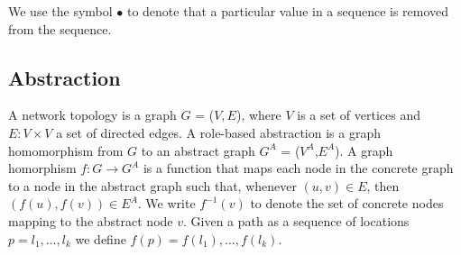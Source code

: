 \documentclass[twocolumn, openany]{sig-alternate-10pt}
\begin{document}



We use the symbol $\bullet$ to denote that a particular value in a sequence is removed from the sequence.

\subsection{Abstraction}

A network topology is a graph $G$ = ($V, E$), where $V$ is a set of vertices and $E \colon V \times V$ a set of directed edges. A role-based abstraction is a graph homomorphism from $G$ to an abstract graph $G^A$ = ($V^A$,$E^A$). A graph homorphism $f : G \rightarrow G^A$ is a function that maps each node in the concrete graph to a node in the abstract graph such that, whenever $(u,v) \in E$, then $(f(u),f(v)) \in E^A$. We write $f^{-1}(v)$ to denote the set of concrete nodes mapping to the abstract node $v$. Given a path as a sequence of locations $p = l_1, \dots, l_k$ we define $f(p) = f(l_1), \dots, f(l_k)$.
\end{document}
